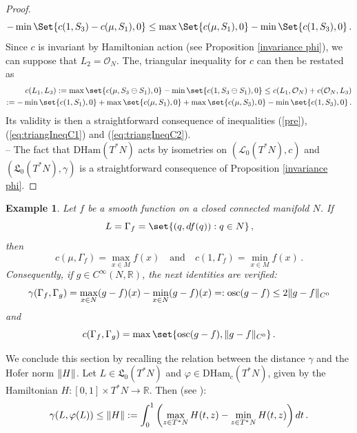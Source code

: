 \documentclass{article}
\newcommand{\1}{\mathbbm{1}}
\DeclarePairedDelimiter{\norm}{\lVert}{\rVert}
\newtheorem{es}{Example}
\theoremstyle{remark}
\begin{document}
{{\begin{proof}
\begin{equation}\label{eq:triangIneqC2}
-\min\Set{ c(1, S_3) - c(\mu, S_1), 0}\leq \max\Set{c(\mu, S_1), 0}-\min\Set{c(1, S_3), 0}\, .
\end{equation}
Since $c$ is invariant by Hamiltonian action (see Proposition \ref{invariance phi}), we can suppose that $L_2 = \mathcal{O}_N$. The, triangular inequality for $c$ can then be restated as
\begin{eqnarray*}
c(L_1,L_3) := \max \set{c(\mu,S_3\ominus S_1),0} -\min \set{c(1,S_3\ominus S_1),0} \le c(L_1,\mathcal{O}_N) + c(\mathcal{O}_N,L_3) \\
:= -\min \set{ c(1,S_1),0} + \max \set{ c(\mu,S_1),0} + \max \set{c(\mu,S_3),0} - \min \set{c(1,S_3),0}\, .
\end{eqnarray*}
Its validity is then a straightforward consequence of inequalities (\ref{pre}), (\ref{eq:triangIneqC1}) and (\ref{eq:triangIneqC2}). \\
-- The fact that $\mathrm{DHam}(T^*N)$ acts by isometries on $(\mathscr{L}_0(T^*N),c)$ and $(\mathfrak{L}_0(T^*N),\gamma)$ is a straightforward consequence of Proposition \ref{invariance phi}.
\end{proof}
\begin{es} \textnormal{Let $f$ be a smooth function on a closed connected manifold $N$. If
$$L = \Gamma_f = \set{ (q,df(q)): q \in N}\, ,$$
then
$$c(\mu,\Gamma_f) = \max_{x \in M}f(x) \quad \text{and} \quad c(1,\Gamma_f) = \min_{x \in M}f(x)\, .$$
Consequently, if $g \in C^{\infty}(N,\mathbb{R})$, the next identities are verified:
$$\gamma(\Gamma_f,\Gamma_g) = \max_{x \in N} (g-f)(x) - \min_{x \in N} (g-f)(x) =: \mathrm{osc}(g-f) \le 2 \norm{g-f}_{C^0}$$
and
$$c(\Gamma_f,\Gamma_g) =  \max\set{ \mathrm{osc}(g-f), \norm{g-f}_{C^0} }\, .$$
}
\end{es}
\noindent We conclude this section by recalling the relation between the distance $\gamma$ and the Hofer norm $\norm{H}$. Let $L \in \mathfrak{L}_0(T^*N)$ and $\varphi \in \mathrm{DHam}_c(T^*N)$, given by the Hamiltonian $H: [0,1] \times T^*N \to \mathbb{R}$. Then (see \cite{vit92}):
\begin{equation}
\gamma(L,\varphi(L)) \le \norm{H} := \int^1_0 \left( \max_{z \in T^*N} H(t,z) - \min_{z \in T^*N} H(t,z) \right) dt\, .
\end{equation}
}}
\end{document}
